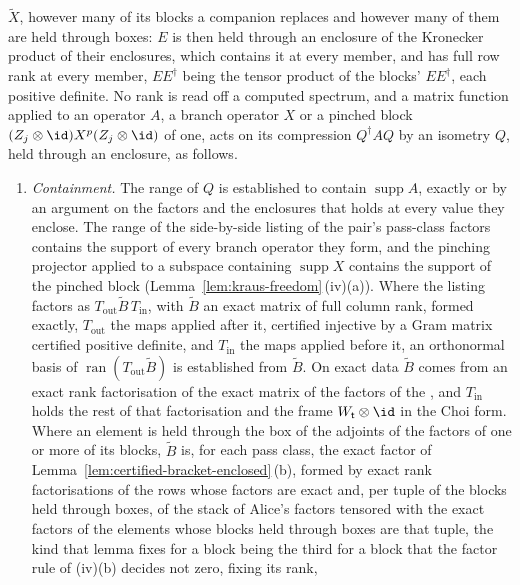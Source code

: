 \begin{requirement}
\begin{enumerate}[label=(\roman*),leftmargin=2.4em]
  $\widetilde X$, however many of its blocks a companion replaces and
  however many of them are held through boxes: $E$ is then held through an
  enclosure of the Kronecker product of their enclosures, which contains it
  at every member, and has full row rank at every member, $EE^{\dagger}$
  being the tensor product of the blocks' $EE^{\dagger}$, each positive
  definite. No rank is read off a computed spectrum, and a matrix function applied to
  an operator $A$, a branch operator $X$ or a pinched block
  $(Z_j\otimes\id)X^{p}(Z_j\otimes\id)$ of one, acts on its compression
  $Q^{\dagger}AQ$ by an isometry $Q$, held through an enclosure, as follows.
  \begin{enumerate}[label=(\alph*),leftmargin=2.2em]
  \item \emph{Containment.} The range of $Q$ is established to contain
    $\operatorname{supp}A$, exactly or by an argument on the factors and the
    enclosures that holds at every value they enclose. The range of the
    side-by-side listing of the pair's pass-class factors contains the support
    of every branch operator they form, and the pinching projector applied to
    a subspace containing $\operatorname{supp}X$ contains the support of the
    pinched block (Lemma~\ref{lem:kraus-freedom}\,(iv)(a)). Where the
    listing factors as $T_{\mathrm{out}}\widetilde B\,T_{\mathrm{in}}$, with
    $\widetilde B$ an exact matrix of full column rank, formed exactly,
    $T_{\mathrm{out}}$ the maps applied after it, certified injective by a
    Gram matrix certified positive definite, and $T_{\mathrm{in}}$ the maps
    applied before it, an orthonormal basis of
    $\operatorname{ran}(T_{\mathrm{out}}\widetilde B)$ is established from
    $\widetilde B$. On exact data $\widetilde B$ comes from an exact rank
    factorisation of the exact matrix of the factors of the
    , and $T_{\mathrm{in}}$ holds the rest of
    that factorisation and the frame $W_{\mathsf t}\otimes\id$ in the Choi
    form. Where an element is held through the box of the adjoints of the
    factors of one or more of its blocks, $\widetilde B$ is, for each pass class, the exact factor of
    Lemma~\ref{lem:certified-bracket-enclosed}\,(b), formed by exact rank
    factorisations of the rows whose factors are exact and, per tuple of the
    blocks held through boxes, of the stack of Alice's factors tensored with
    the exact factors of the elements whose blocks held through boxes are
    that tuple, the kind that lemma fixes for a block being the third for a
    block that the factor rule of (iv)(b) decides not zero, fixing its rank,

\end{enumerate}
\end{enumerate}
\end{requirement}

